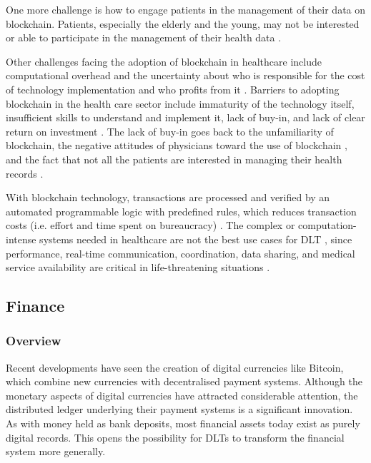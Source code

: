 One more challenge is how to engage patients in the management of their data on blockchain. Patients, especially the elderly and the young, may not be interested or able to participate in the management of their health data \cite{radanovic2018opportunities}.

Other challenges facing the adoption of blockchain in healthcare include computational overhead and the uncertainty about who is responsible for the cost of technology implementation and who profits from it \cite{engelhardt2017hitching,uddin2018continuous}. Barriers to adopting blockchain in the health care sector include immaturity of the technology itself, insufficient skills to understand and implement it, lack of buy-in, and lack of clear return on investment \cite{mamoshina2018converging}. The lack of buy-in goes back to the unfamiliarity of blockchain, the negative attitudes of physicians toward the use of blockchain \cite{zhao2018efficient}, and the fact that not all the patients are interested in managing their health records \cite{kamel2018geospatial}. 

With blockchain technology, transactions are processed and verified by an automated programmable logic with predefined rules, which reduces transaction costs (i.e. effort and time spent on bureaucracy) \cite{roman2018blockchain,zhang2018fhirchain}. The complex or computation-intense systems needed in healthcare are not the best use cases for DLT \cite{keele2007guidelines}, since performance, real-time communication, coordination, data sharing, and medical service availability are critical in life-threatening situations \cite{kamel2018geospatial}.

\subsection{Finance}
\label{ssec:finance}

\subsubsection{Overview}
\label{sssec:f-overview}

Recent developments have seen the creation of digital currencies like Bitcoin, which combine new currencies with decentralised payment systems. Although the monetary aspects of digital currencies have attracted considerable attention, the distributed ledger underlying their payment systems is a significant innovation. As with money held as bank deposits, most financial assets today exist as purely digital records. This opens the possibility for DLTs to transform the financial system more generally.

